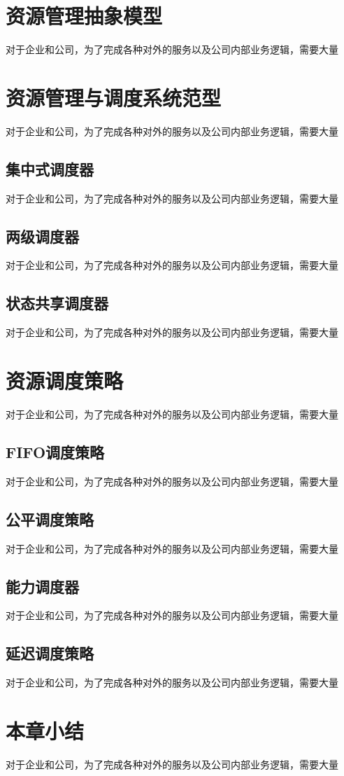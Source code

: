 \section{资源管理抽象模型}

对于企业和公司，为了完成各种对外的服务以及公司内部业务逻辑，需要大量

\section{资源管理与调度系统范型}
对于企业和公司，为了完成各种对外的服务以及公司内部业务逻辑，需要大量
\subsection{集中式调度器}
对于企业和公司，为了完成各种对外的服务以及公司内部业务逻辑，需要大量
\subsection{两级调度器}
对于企业和公司，为了完成各种对外的服务以及公司内部业务逻辑，需要大量
\subsection{状态共享调度器}
对于企业和公司，为了完成各种对外的服务以及公司内部业务逻辑，需要大量

\section{资源调度策略}

对于企业和公司，为了完成各种对外的服务以及公司内部业务逻辑，需要大量

\subsection{FIFO调度策略}
对于企业和公司，为了完成各种对外的服务以及公司内部业务逻辑，需要大量
\subsection{公平调度策略}
对于企业和公司，为了完成各种对外的服务以及公司内部业务逻辑，需要大量
\subsection{能力调度器}
对于企业和公司，为了完成各种对外的服务以及公司内部业务逻辑，需要大量
\subsection{延迟调度策略}
对于企业和公司，为了完成各种对外的服务以及公司内部业务逻辑，需要大量

\section{本章小结}

对于企业和公司，为了完成各种对外的服务以及公司内部业务逻辑，需要大量
